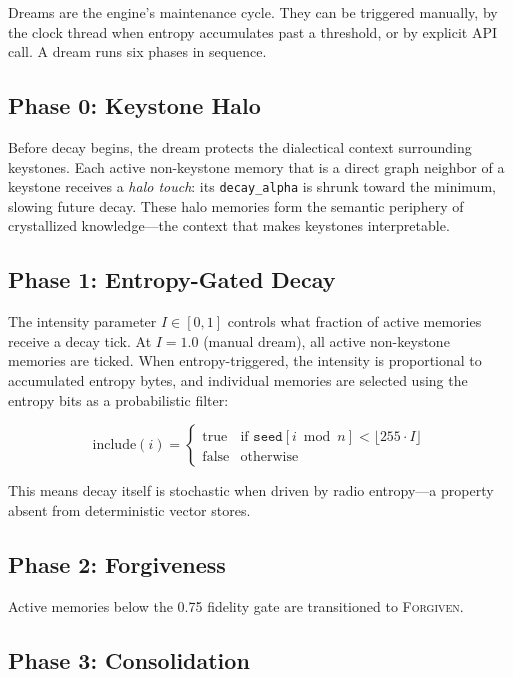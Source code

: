 \documentclass[twocolumn,10pt]{article}
\begin{document}
Dreams are the engine's maintenance cycle.  They can be triggered
manually, by the clock thread when entropy accumulates past a threshold,
or by explicit API call.  A dream runs six phases in sequence.

\subsection{Phase 0: Keystone Halo}

Before decay begins, the dream protects the dialectical context surrounding
keystones.  Each active non-keystone memory that is a direct graph neighbor
of a keystone receives a \textit{halo touch}: its \texttt{decay\_alpha} is
shrunk toward the minimum, slowing future decay.  These halo memories form
the semantic periphery of crystallized knowledge---the context that makes
keystones interpretable.

\subsection{Phase 1: Entropy-Gated Decay}

The intensity parameter $I \in [0, 1]$ controls what fraction of active
memories receive a decay tick.  At $I = 1.0$ (manual dream), all
active non-keystone memories are ticked.  When entropy-triggered, the
intensity is proportional to accumulated entropy bytes, and individual
memories are selected using the entropy bits as a probabilistic filter:

\begin{equation}
\text{include}(i) =
\begin{cases}
\text{true} & \text{if } \texttt{seed}[i \bmod n] < \lfloor 255 \cdot I \rfloor \\
\text{false} & \text{otherwise}
\end{cases}
\end{equation}

\noindent
This means decay itself is stochastic when driven by radio entropy---a
property absent from deterministic vector stores.

\subsection{Phase 2: Forgiveness}

Active memories below the 0.75 fidelity gate are transitioned to
\textsc{Forgiven}.

\subsection{Phase 3: Consolidation}
\end{document}
